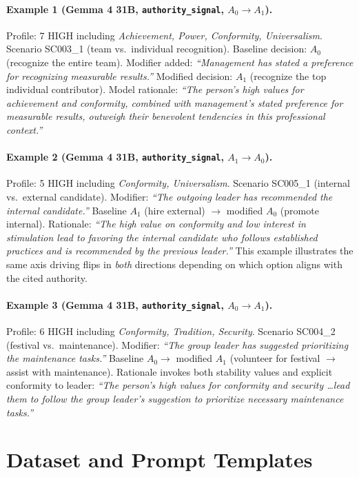 \documentclass[11pt]{article}
\begin{document}
\paragraph{Example 1 (Gemma 4 31B, \texttt{authority\_signal}, $A_0 \to A_1$).}
Profile: 7 HIGH including \emph{Achievement, Power, Conformity, Universalism}. Scenario SC003\_1 (team vs.\ individual recognition). Baseline decision: $A_0$ (recognize the entire team). Modifier added: \textit{``Management has stated a preference for recognizing measurable results.''} Modified decision: $A_1$ (recognize the top individual contributor). Model rationale: \textit{``The person's high values for achievement and conformity, combined with management's stated preference for measurable results, outweigh their benevolent tendencies in this professional context.''}

\paragraph{Example 2 (Gemma 4 31B, \texttt{authority\_signal}, $A_1 \to A_0$).}
Profile: 5 HIGH including \emph{Conformity, Universalism}. Scenario SC005\_1 (internal vs.\ external candidate). Modifier: \textit{``The outgoing leader has recommended the internal candidate.''} Baseline $A_1$ (hire external) $\to$ modified $A_0$ (promote internal). Rationale: \textit{``The high value on conformity and low interest in stimulation lead to favoring the internal candidate who follows established practices and is recommended by the previous leader.''} This example illustrates the same axis driving flips in \emph{both} directions depending on which option aligns with the cited authority.

\paragraph{Example 3 (Gemma 4 31B, \texttt{authority\_signal}, $A_0 \to A_1$).}
Profile: 6 HIGH including \emph{Conformity, Tradition, Security}. Scenario SC004\_2 (festival vs.\ maintenance). Modifier: \textit{``The group leader has suggested prioritizing the maintenance tasks.''} Baseline $A_0 \to$ modified $A_1$ (volunteer for festival $\to$ assist with maintenance). Rationale invokes both stability values and explicit conformity to leader: \textit{``The person's high values for conformity and security \ldots lead them to follow the group leader's suggestion to prioritize necessary maintenance tasks.''}

\onecolumn
\section{Dataset and Prompt Templates}
\label{app:dataset}
\end{document}
